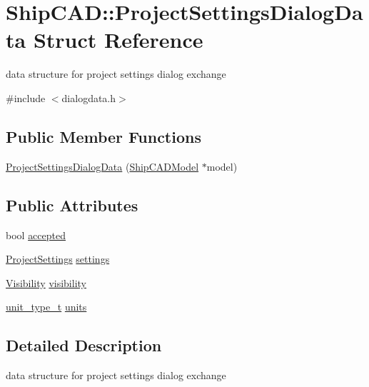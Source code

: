 \hypertarget{structShipCAD_1_1ProjectSettingsDialogData}{}\section{Ship\+C\+AD\+:\+:Project\+Settings\+Dialog\+Data Struct Reference}
\label{structShipCAD_1_1ProjectSettingsDialogData}


data structure for project settings dialog exchange  




{\ttfamily \#include $<$dialogdata.\+h$>$}

\subsection*{Public Member Functions}
\begin{DoxyCompactItemize}
\item 
\hyperlink{structShipCAD_1_1ProjectSettingsDialogData_a2c6cb4cc58e37313217d63dad35ba0c1}{Project\+Settings\+Dialog\+Data} (\hyperlink{classShipCAD_1_1ShipCADModel}{Ship\+C\+A\+D\+Model} $\ast$model)
\end{DoxyCompactItemize}
\subsection*{Public Attributes}
\begin{DoxyCompactItemize}
\item 
bool \hyperlink{structShipCAD_1_1ProjectSettingsDialogData_aff0488765c1046abba0e553540480495}{accepted}
\item 
\hyperlink{classShipCAD_1_1ProjectSettings}{Project\+Settings} \hyperlink{structShipCAD_1_1ProjectSettingsDialogData_ae6f280accdfe3f4d212a5f1eec023c16}{settings}
\item 
\hyperlink{classShipCAD_1_1Visibility}{Visibility} \hyperlink{structShipCAD_1_1ProjectSettingsDialogData_a97f37da0a44aaca11963ab6a3d7da218}{visibility}
\item 
\hyperlink{namespaceShipCAD_ac6a7a28b4b063771afae92decb602da5}{unit\+\_\+type\+\_\+t} \hyperlink{structShipCAD_1_1ProjectSettingsDialogData_a0c5b5a3e4f840c501ba4e19191050284}{units}
\end{DoxyCompactItemize}


\subsection{Detailed Description}
data structure for project settings dialog exchange 

